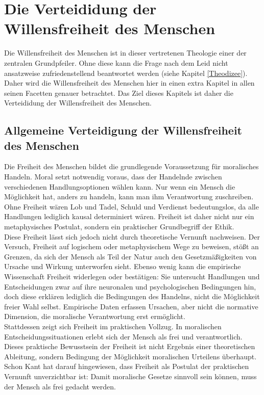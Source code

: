 \chapter{Die Verteididung der Willensfreiheit des Menschen} \label{Willensfreiheit}
Die Willensfreiheit des Menschen ist in dieser vertretenen Theologie einer der zentralen Grundpfeiler. Ohne diese kann die Frage nach dem Leid nicht ansatzweise zufriedenstellend beantwortet werden (siehe Kapitel \ref{Theodizee}). Daher wird die Willensfreiheit des Menschen hier in einen extra Kapitel in allen seinen Facetten genauer betrachtet. Das Ziel dieses Kapitels ist daher die Verteididung der Willensfreiheit des Menschen.\\

\section{Allgemeine Verteidigung der Willensfreiheit des Menschen}
Die Freiheit des Menschen bildet die grundlegende Voraussetzung für moralisches Handeln. Moral setzt notwendig voraus, dass der Handelnde zwischen verschiedenen Handlungsoptionen wählen kann. Nur wenn ein Mensch die Möglichkeit hat, anders zu handeln, kann man ihm Verantwortung zuschreiben. Ohne Freiheit wären Lob und Tadel, Schuld und Verdienst bedeutungslos, da alle Handlungen lediglich kausal determiniert wären. Freiheit ist daher nicht nur ein metaphysisches Postulat, sondern ein praktischer Grundbegriff der Ethik.\\

Diese Freiheit lässt sich jedoch nicht durch theoretische Vernunft nachweisen. Der Versuch, Freiheit auf logischem oder metaphysischem Wege zu beweisen, stößt an Grenzen, da sich der Mensch als Teil der Natur auch den Gesetzmäßigkeiten von Ursache und Wirkung unterworfen sieht. Ebenso wenig kann die empirische Wissenschaft Freiheit widerlegen oder bestätigen: Sie untersucht Handlungen und Entscheidungen zwar auf ihre neuronalen und psychologischen Bedingungen hin, doch diese erklären lediglich die Bedingungen des Handelns, nicht die Möglichkeit freier Wahl selbst. Empirische Daten erfassen Ursachen, aber nicht die normative Dimension, die moralische Verantwortung erst ermöglicht.\\

Stattdessen zeigt sich Freiheit im praktischen Vollzug. In moralischen Entscheidungssituationen erlebt sich der Mensch als frei und verantwortlich. Dieses praktische Bewusstsein der Freiheit ist nicht Ergebnis einer theoretischen Ableitung, sondern Bedingung der Möglichkeit moralischen Urteilens überhaupt. Schon Kant hat darauf hingewiesen, dass Freiheit als Postulat der praktischen Vernunft unverzichtbar ist: Damit moralische Gesetze sinnvoll sein können, muss der Mensch als frei gedacht werden.\\

